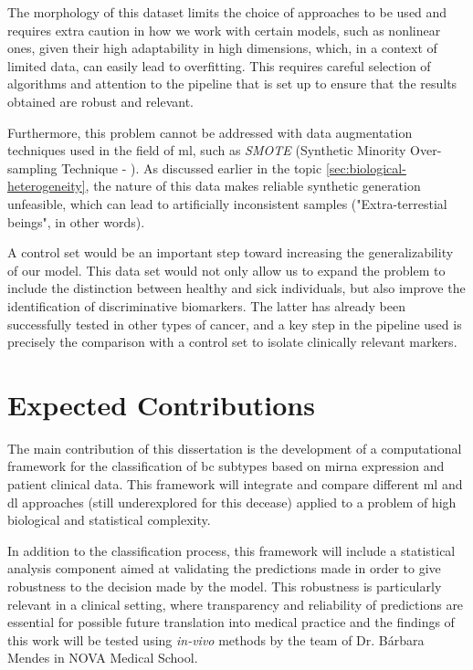 The morphology of this dataset limits the choice of approaches to be used and
requires extra caution in how we work with certain models, such as nonlinear
ones, given their high adaptability in high dimensions, which, in a context of
limited data, can easily lead to overfitting. This requires careful selection
of algorithms and attention to the pipeline that is set up to ensure that the
results obtained are robust and relevant.

Furthermore, this problem cannot be addressed with data augmentation techniques
used in the field of \gls{ml}, such as \textit{SMOTE} (Synthetic Minority
Over-sampling Technique - \textcite{SMOTE_Blagus2013SMOTE}). As discussed
earlier in the topic \ref{sec:biological-heterogeneity}, the nature of this
data makes reliable synthetic generation unfeasible, which can lead to
artificially inconsistent samples ("Extra-terrestial beings", in other words).

A control set would be an important step toward increasing the generalizability
of our model. This data set would not only allow us to expand the problem to
include the distinction between healthy and sick individuals, but also improve
the identification of discriminative biomarkers. The latter has already been
successfully tested in other types of cancer, and a key step in the pipeline
used is precisely the comparison with a control set \cite{ml_gastric_Azari2023}
to isolate clinically relevant markers.

\section{Expected Contributions}
\label{sec:expected-contributions}
The main contribution of this dissertation is the development of a computational
framework for the classification of \gls{bc} subtypes based on \gls{mirna}
expression and patient clinical data. This framework will integrate
and compare different \gls{ml} and \gls{dl} approaches (still underexplored for this decease)
applied to a problem of high biological and statistical complexity.

In addition to the classification process, this framework will include a
statistical analysis component aimed at validating the predictions made in
order to give robustness to the decision made by the model. This robustness is
particularly relevant in a clinical setting, where transparency and reliability
of predictions are essential for possible future translation into medical
practice and the findings of this work will be tested using \textit{in-vivo}
methods by the team of Dr. Bárbara Mendes in NOVA Medical School.


